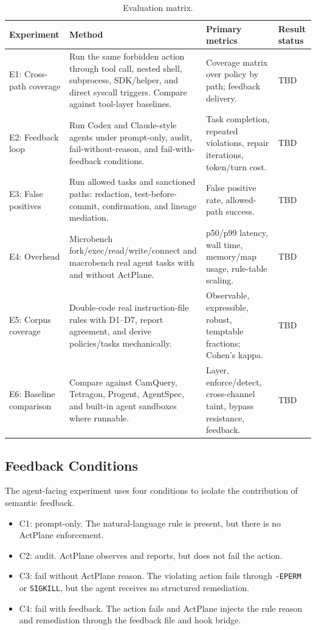 \begin{table}[t]
\centering
\caption{Evaluation matrix.}
\begin{tabular}{p{}p{}p{}p{}}
\toprule
Experiment & Method & Primary metrics & Result status \\
\midrule
E1: Cross-path coverage &
Run the same forbidden action through tool call, nested shell, subprocess, SDK/helper, and direct syscall triggers. Compare against tool-layer baselines. &
Coverage matrix over policy by path; feedback delivery. &
\textsc{TBD} \\
\midrule
E2: Feedback loop &
Run Codex and Claude-style agents under prompt-only, audit, fail-without-reason, and fail-with-feedback conditions. &
Task completion, repeated violations, repair iterations, token/turn cost. &
\textsc{TBD} \\
\midrule
E3: False positives &
Run allowed tasks and sanctioned paths: redaction, test-before-commit, confirmation, and lineage mediation. &
False positive rate, allowed-path success. &
\textsc{TBD} \\
\midrule
E4: Overhead &
Microbench fork/exec/read/write/connect and macrobench real agent tasks with and without ActPlane. &
p50/p99 latency, wall time, memory/map usage, rule-table scaling. &
\textsc{TBD} \\
\midrule
E5: Corpus coverage &
Double-code real instruction-file rules with D1--D7, report agreement, and derive policies/tasks mechanically. &
Observable, expressible, robust, temptable fractions; Cohen's kappa. &
\textsc{TBD} \\
\midrule
E6: Baseline comparison &
Compare against CamQuery, Tetragon, Progent, AgentSpec, and built-in agent sandboxes where runnable. &
Layer, enforce/detect, cross-channel taint, bypass resistance, feedback. &
\textsc{TBD} \\
\bottomrule
\end{tabular}
\label{tab:eval-plan}
\end{table}

\subsection{Feedback Conditions}

The agent-facing experiment uses four conditions to isolate the contribution of
semantic feedback.

\begin{itemize}
\item C1: prompt-only. The natural-language rule is present, but there is no
ActPlane enforcement.
\item C2: audit. ActPlane observes and reports, but does not fail the action.
\item C3: fail without ActPlane reason. The violating action fails through
\texttt{-EPERM} or \texttt{SIGKILL}, but the agent receives no structured
remediation.
\item C4: fail with feedback. The action fails and ActPlane injects the rule
reason and remediation through the feedback file and hook bridge.
\end{itemize}

